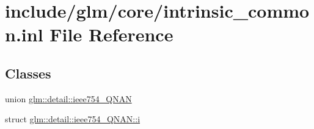 \hypertarget{intrinsic__common_8inl}{\section{include/glm/core/intrinsic\-\_\-common.inl \-File \-Reference}
\label{intrinsic__common_8inl}
}
\subsection*{\-Classes}
\begin{DoxyCompactItemize}
\item 
union \hyperlink{unionglm_1_1detail_1_1ieee754__QNAN}{glm\-::detail\-::ieee754\-\_\-\-Q\-N\-A\-N}
\item 
struct \hyperlink{structglm_1_1detail_1_1ieee754__QNAN_1_1i}{glm\-::detail\-::ieee754\-\_\-\-Q\-N\-A\-N\-::i}
\end{DoxyCompactItemize}
